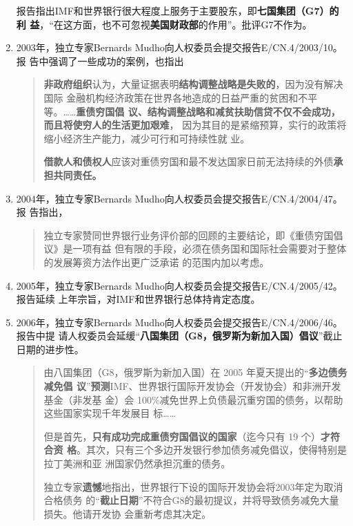 \begin{enumerate}
  报告指出IMF和世界银行很大程度上服务于主要股东，即\textbf{七国集团（G7）的利
    益}，“在这方面，也不可忽视\textbf{美国财政部}的作用”。批评G7不作为。

\item 2003年，独立专家Bernards Mudho向人权委员会提交报告E/CN.4/2003/10。报
  告中强调了一些成功的案例，也指出
  \begin{quotation}
    \textbf{非政府组织}认为，大量证据表明\textbf{结构调整战略是失败的}，因为没有解决国际
    金融机构经济政策在世界各地造成的日益严重的贫困和不平等。……\textbf{重债穷国倡
      议、结构调整战略和减贫扶助信贷不仅不会成功，而且将使穷人的生活更加艰难}，
    因为其目的是紧缩预算，实行的政策将缩小经济生产能力，减少可行和可持续性就
    业。

    \textbf{借款人和债权人}应该对重债穷国和最不发达国家日前无法持续的外债\textbf{承担共同责任。}
  \end{quotation}

\item 2004年，独立专家Bernards Mudho向人权委员会提交报告E/CN.4/2004/47。报
  告指出，
  \begin{quotation}
    独立专家赞同世界银行业务评价部的回顾的主要结论，即《重债穷国倡议》是一项有益
    但有限的手段，必须在债务国和国际社会需要对于整体的发展筹资方法作出更广泛承诺
    的范围内加以考虑。
  \end{quotation}

\item 2005年，独立专家Bernards Mudho向人权委员会提交报告E/CN.4/2005/42。报告延续
  上年宗旨，对IMF和世界银行总体持肯定态度。

\item 2006年，独立专家Bernards Mudho向人权委员会提交报告E/CN.4/2006/46。报告中提
  请人权委员会延缓“\textbf{八国集团（G8，俄罗斯为新加入国）倡议}”截止日期的进步性。
  \begin{quotation}
    由八国集团（G8，俄罗斯为新加入国）在 2005 年夏天提出的“\textbf{多边债务减免倡
      议}”\textbf{预测}IMF、世界银行国际开发协会（开发协会）和非洲开发基金（非发基
    金）会 100\%减免世界上负债最沉重穷国的债务，以帮助这些国家实现千年发展目
    标……

    但是首先，\textbf{只有成功完成重债穷国倡议的国家}（迄今只有 19 个）\textbf{才符合资
      格}。其次，只有三个多边开发银行参加债务减免倡议，使得特别是拉丁美洲和亚
    洲国家仍然承担沉重的债务。

    独立专家\textbf{遗憾}地指出，世界银行下设的国际开发协会将2003年定为取消合格债务
    的“\textbf{截止日期}”不符合G8的最初提议，并将导致债务减免大量损失。他请开发协
    会重新考虑其决定。
  \end{quotation}


\end{enumerate}
